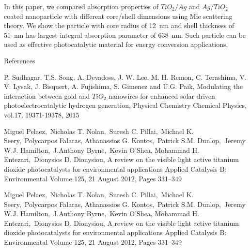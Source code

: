 \documentclass[aip,jap,reprint]{revtex4-1}
\begin{document}
In this paper, we compared absorption properties of $TiO_2/Ag$ and $Ag/TiO_2$
coated nanoparticle with different core/shell dimensions using Mie
scattering theory. We show the particle with core radius of 12~nm and
shell thickness of 51~nm has largest integral absorption parameter of
638~nm. Such particle can be used as effective photocatalytic material
for energy conversion applications.

References

P. Sudhagar, T.S. Song, A. Devadoss, J. W. Lee, M. H. Remon, C.
Terashima, V. V. Lysak, J. Bisquert, A. Fujishima, S. Gimenez and U.G.
Paik, Modulating the interaction between gold and $TiO_2$ nanowires for
enhanced solar driven photoelectrocatalytic hydrogen generation,
Physical Chemistry Chemical Physics, vol.17, 19371-19378, 2015

Miguel Pelaez,~Nicholas T. Nolan,~Suresh C. Pillai,~Michael K.
Seery,~Polycarpos Falaras, Athanassios G. Kontos,~Patrick S.M.
Dunlop,~Jeremy W.J. Hamilton,~J.Anthony Byrne,~Kevin
O'Shea, Mohammad H. Entezari,~Dionysios D. Dionysiou,
A review on the visible light active titanium dioxide photocatalysts
for environmental applications Applied Catalysis B: Environmental
Volume 125, 21 August 2012, Pages 331{}--349

Miguel Pelaez,~Nicholas
T. Nolan,~Suresh C. Pillai,~Michael K. Seery,~Polycarpos Falaras,
Athanassios G. Kontos,~Patrick S.M. Dunlop,~Jeremy W.J.
Hamilton,~J.Anthony Byrne,~Kevin O'Shea, Mohammad H.
Entezari,~Dionysios D. Dionysiou, A review on the visible light active
titanium dioxide photocatalysts for environmental applications Applied
Catalysis B: Environmental Volume 125, 21 August 2012, Pages 331--349
\end{document}
